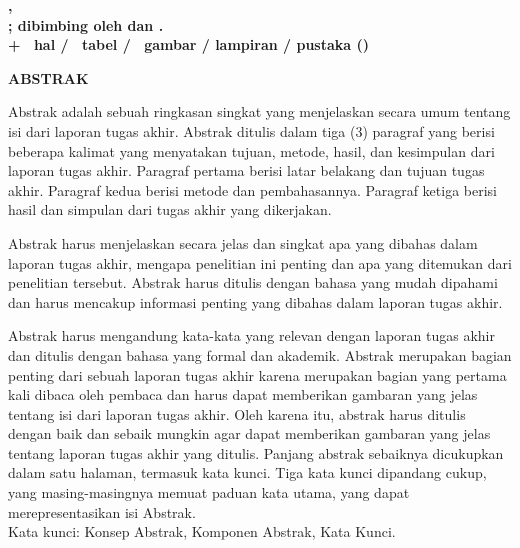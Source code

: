 
\clearpage
{}
{}
\noindent\textbf{\penulis, \nim}\\
\textbf{\MakeUppercase{\judulid}; dibimbing oleh {\pembimbingutama} dan {\pembimbingpendamping}.}\\
\textbf{\pageref{LastPage} + \getromanpagelast\ hal / \tottab\ tabel / \totfig\ gambar /  lampiran /  pustaka (\tahunakademik)}
\begin{center}
    \textbf{ABSTRAK}\\[0.5cm]
\end{center}

Abstrak adalah sebuah ringkasan singkat yang menjelaskan secara umum tentang isi dari laporan tugas akhir. Abstrak ditulis dalam tiga (3) paragraf yang berisi beberapa kalimat yang menyatakan tujuan, metode, hasil, dan kesimpulan dari laporan tugas akhir. Paragraf pertama berisi latar belakang dan tujuan tugas akhir. Paragraf kedua berisi metode dan pembahasannya. Paragraf ketiga berisi hasil dan simpulan dari tugas akhir yang dikerjakan.

Abstrak harus menjelaskan secara jelas dan singkat apa yang dibahas dalam laporan tugas akhir, mengapa penelitian ini penting dan apa yang ditemukan dari penelitian tersebut. Abstrak harus ditulis dengan bahasa yang mudah dipahami dan harus mencakup informasi penting yang dibahas dalam laporan tugas akhir.

Abstrak harus mengandung kata-kata yang relevan dengan laporan tugas akhir dan ditulis dengan bahasa yang formal dan akademik. Abstrak merupakan bagian penting dari sebuah laporan tugas akhir karena merupakan bagian yang pertama kali dibaca oleh pembaca dan harus dapat memberikan gambaran yang jelas tentang isi dari laporan tugas akhir. Oleh karena itu, abstrak harus ditulis dengan baik dan sebaik mungkin agar dapat memberikan gambaran yang jelas tentang laporan tugas akhir yang ditulis. Panjang abstrak sebaiknya dicukupkan dalam satu halaman, termasuk kata kunci. Tiga kata kunci dipandang cukup, yang masing-masingnya memuat paduan kata utama, yang dapat merepresentasikan isi Abstrak.\\[0.6cm]

\noindent Kata kunci: Konsep Abstrak, Komponen Abstrak, Kata Kunci.
